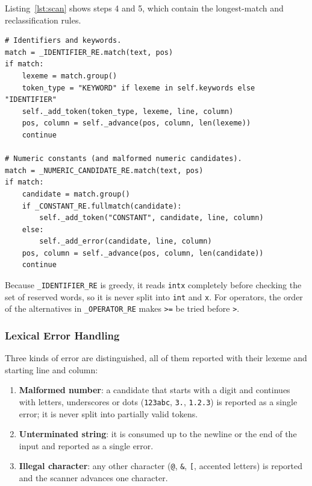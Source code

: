 \documentclass[11pt,letterpaper]{article}
\newcommand{\tok}[1]{\texttt{#1}}
\begin{document}
Listing~\ref{lst:scan} shows steps 4 and 5, which contain the longest-match
and reclassification rules.

\par\noindent\begin{minipage}{\linewidth}
\begin{lstlisting}[style=pycode, caption={Recognition of identifiers, keywords and constants.}, label={lst:scan}]
# Identifiers and keywords.
match = _IDENTIFIER_RE.match(text, pos)
if match:
    lexeme = match.group()
    token_type = "KEYWORD" if lexeme in self.keywords else "IDENTIFIER"
    self._add_token(token_type, lexeme, line, column)
    pos, column = self._advance(pos, column, len(lexeme))
    continue

# Numeric constants (and malformed numeric candidates).
match = _NUMERIC_CANDIDATE_RE.match(text, pos)
if match:
    candidate = match.group()
    if _CONSTANT_RE.fullmatch(candidate):
        self._add_token("CONSTANT", candidate, line, column)
    else:
        self._add_error(candidate, line, column)
    pos, column = self._advance(pos, column, len(candidate))
    continue
\end{lstlisting}
\end{minipage}\par\smallskip

Because \tok{\_IDENTIFIER\_RE} is greedy, it reads \tok{intx} completely
before checking the set of reserved words, so it is never split into \tok{int}
and \tok{x}. For operators, the order of the alternatives in
\tok{\_OPERATOR\_RE} makes \tok{>=} be tried before \tok{>}.

\subsubsection{Lexical Error Handling}

Three kinds of error are distinguished, all of them reported with their
lexeme and starting line and column:

\begin{enumerate}[nosep]
  \item \textbf{Malformed number}: a candidate that starts with a digit and
        continues with letters, underscores or dots (\tok{123abc}, \tok{3.},
        \tok{1.2.3}) is reported as a single error; it is never split into
        partially valid tokens.
  \item \textbf{Unterminated string}: it is consumed up to the newline or the
        end of the input and reported as a single error.
  \item \textbf{Illegal character}: any other character (\tok{@}, \tok{\&},
        \tok{[}, accented letters) is reported and the scanner advances one
        character.
\end{enumerate}
\end{document}
